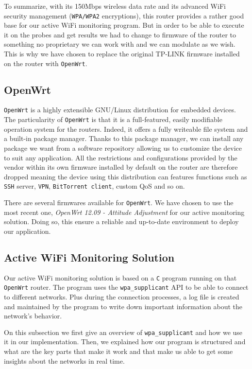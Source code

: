 To summarize, with its 150Mbps wireless data rate and its advanced WiFi security management (\texttt{WPA/WPA2} encryptions), this router provides a rather good base for our active WiFi monitoring program. But in order to be able to execute it on the probes and get results we had to change to firmware of the router to something no proprietary we can work with and we can modulate as we wish. This is why we have chosen to replace the original TP-LINK firmware installed on the router with \texttt{OpenWrt}.


\subsection{OpenWrt}
\texttt{OpenWrt}\cite{openwrt} is a highly extensible GNU/Linux distribution for embedded devices. The particularity of \texttt{OpenWrt} is that it is a full-featured, easily modifiable operation system for the routers. Indeed, it offers a fully writeable file system and a built-in package manager. Thanks to this package manager, we can install any package we want from a software repository allowing us to customize the device to suit any application. All the restrictions and configurations provided by the vendor within its own firmware installed by default on the router are therefore dropped meaning the device using this distribution can features functions such as \texttt{SSH} server, \texttt{VPN}, \texttt{BitTorrent client}, custom QoS and so on.

There are several firmwares available for \texttt{OpenWrt}. We have chosen to use the most recent one, \textit{OpenWrt 12.09 - Attitude Adjustment} for our active monitoring solution. Doing so, this ensure a reliable and up-to-date environment to deploy our application.


\subsection{Active WiFi Monitoring Solution}
Our active WiFi monitoring solution is based on a \texttt{C} program running on that \texttt{OpenWrt} router. The program uses the \texttt{wpa\_supplicant} API to be able to connect to different networks. Plus during the connection processes, a log file is created and maintained by the program to write down important information about the network's behavior. 

On this subsection we first give an overview of \texttt{wpa\_supplicant} and how we use it in our implementation. Then, we explained how our program is structured and what are the key parts that make it work and that make us able to get some insights about the networks in real time.

